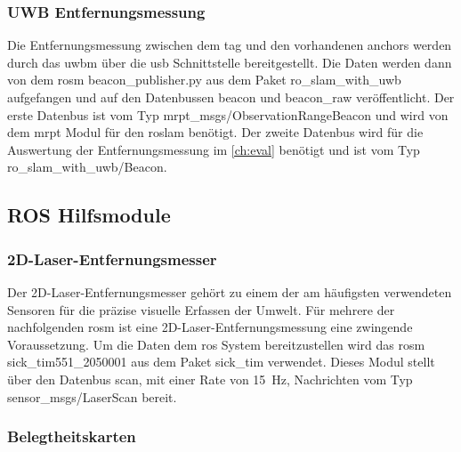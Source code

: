 %
%
%
\subsubsection{UWB Entfernungsmessung}

Die Entfernungsmessung zwischen dem \Gls{tag} und den vorhandenen \Glspl{anchor} werden durch das \Gls{uwbm} über die \Gls{usb} Schnittstelle bereitgestellt. Die Daten werden dann von dem \Gls{rosm} beacon\_publisher.py aus dem Paket ro\_slam\_with\_uwb aufgefangen und auf den Datenbussen beacon und beacon\_raw veröffentlicht. Der erste Datenbus ist vom Typ mrpt\_msgs/ObservationRangeBeacon und wird von dem \Gls{mrpt} Modul für den \Gls{roslam} benötigt. Der zweite Datenbus wird für die Auswertung der Entfernungsmessung im \autoref{ch:eval} benötigt und ist vom Typ ro\_slam\_with\_uwb/Beacon.


%
%
%
\subsection{ROS Hilfsmodule}


%
%
\subsubsection{2D-Laser-Entfernungsmesser}

Der 2D-Laser-Entfernungsmesser gehört zu einem der am häufigsten verwendeten Sensoren für die präzise visuelle Erfassen der Umwelt. Für mehrere der nachfolgenden \Gls{rosm} ist eine 2D-Laser-Entfernungsmessung eine zwingende Voraussetzung. Um die Daten dem \Gls{ros} System bereitzustellen wird das \Gls{rosm} sick\_tim551\_2050001 aus dem Paket sick\_tim verwendet. Dieses Modul stellt über den Datenbus scan, mit einer Rate von \SI{15}{\hertz}, Nachrichten vom Typ sensor\_msgs/LaserScan bereit.


%
%
\subsubsection{Belegtheitskarten}

